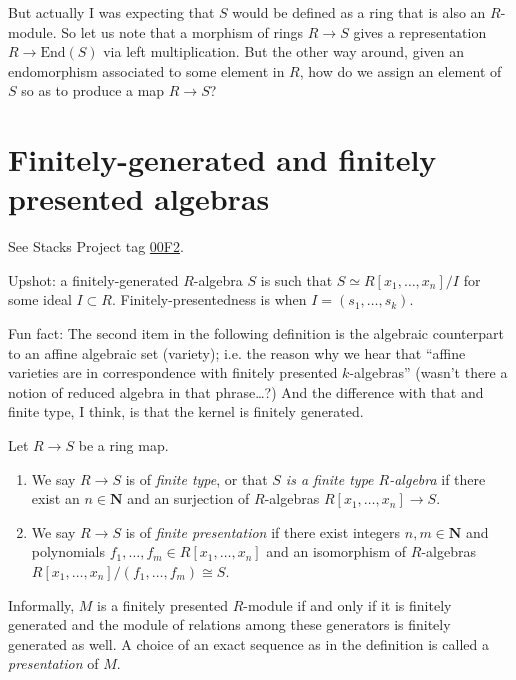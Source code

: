 \noindent
But actually I was expecting that 
$S$ would be defined as 
a ring that is also an $R$-module.
So let us note that a morphism of rings
$R \to S$ gives a representation
$R \to \text{End}(S)$ via left multiplication.
But the other way around,
given an endomorphism associated
to some element in $R$,
how do we assign an element of $S$
so as to produce a map $R \to S$?

\section{Finitely-generated and finitely presented algebras}
\label{section-finitely-presented-generated}

\noindent
See Stacks Project tag \href{https://stacks.math.columbia.edu/tag/00F2}{00F2}.

Upshot: a finitely-generated $R$-algebra $S$ is such that
$S \simeq R[x_1,\ldots,x_n]/I$ for some ideal $I \subset R$.
Finitely-presentedness is when $I = (s_1,\ldots,s_k)$.

Fun fact: The second item in the following definition
is the algebraic counterpart to an
affine algebraic set (variety);
i.e. the reason why we hear that
``affine varieties are in correspondence
with finitely presented $k$-algebras''
(wasn't there a notion of reduced algebra in that phrase…?)
And the difference with that and finite type,
I think,
is that the kernel is finitely generated.

\begin{definition}
\label{definition-finite-type}
Let $R \to S$ be a ring map.
\begin{enumerate}
\item We say $R \to S$ is of {\it finite type}, or that {\it $S$ is a finite
type $R$-algebra} if there exist an $n \in \mathbf{N}$ and an surjection
of $R$-algebras $R[x_1, \ldots, x_n] \to S$.
\item We say $R \to S$ is of {\it finite presentation} if there
exist integers $n, m \in \mathbf{N}$ and polynomials
$f_1, \ldots, f_m \in R[x_1, \ldots, x_n]$
and an isomorphism of $R$-algebras
$R[x_1, \ldots, x_n]/(f_1, \ldots, f_m) \cong S$.
\end{enumerate}
\end{definition}

Informally, $M$ is a finitely presented $R$-module if and only if
it is finitely generated and the module of relations among these
generators is finitely generated as well.
A choice of an exact sequence as in the definition is called a
{\it presentation} of $M$.

